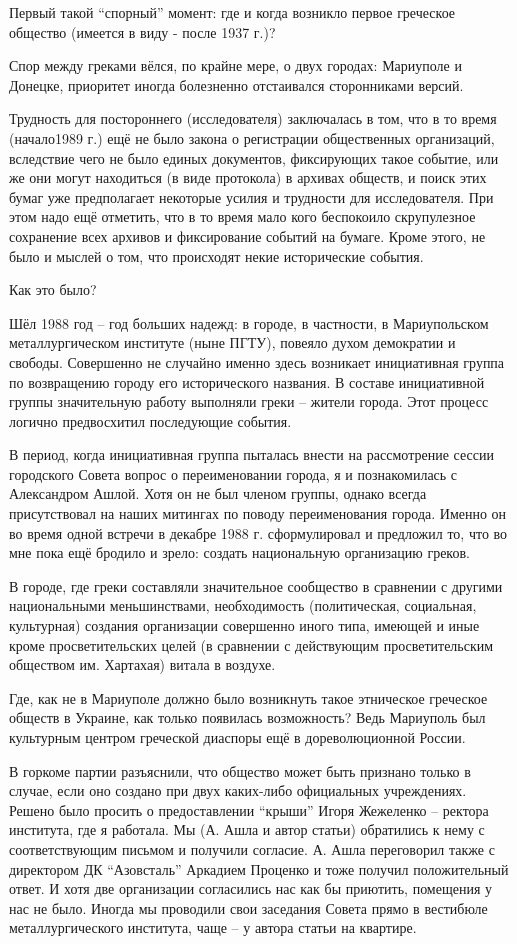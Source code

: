 Первый такой \enquote{спорный} момент: где и когда возникло первое греческое
общество (имеется в виду - после 1937 г.)?

Спор между греками вёлся, по крайне мере, о двух городах: Мариуполе и Донецке,
приоритет иногда болезненно отстаивался сторонниками версий.

Трудность для постороннего (исследователя)  заключалась  в  том, что в то время
(начало1989 г.) ещё не было закона о регистрации общественных организаций,
вследствие чего не было единых документов, фиксирующих такое событие, или же
они могут находиться (в виде протокола) в архивах обществ, и поиск этих бумаг
уже предполагает некоторые усилия и трудности для исследователя. При этом надо
ещё отметить, что в то время мало кого беспокоило скрупулезное сохранение всех
архивов и фиксирование событий на бумаге. Кроме этого, не было и мыслей о том,
что происходят некие исторические события.

Как это было?

Шёл 1988 год – год больших надежд: в городе, в частности, в Мариупольском
металлургическом институте (ныне ПГТУ), повеяло духом демократии и свободы.
Совершенно не случайно именно здесь возникает инициативная группа по
возвращению городу его исторического названия. В составе инициативной группы
значительную работу выполняли греки – жители города. Этот процесс логично
предвосхитил последующие события.

В период, когда инициативная группа пыталась внести на рассмотрение сессии
городского Совета вопрос о переименовании города, я и познакомилась с
Александром Ашлой. Хотя он не был членом группы, однако всегда присутствовал на
наших митингах по поводу переименования города. Именно он во время одной
встречи в декабре 1988 г. сформулировал и  предложил то, что во мне пока ещё
бродило и зрело: создать национальную организацию греков. 

В городе, где греки составляли значительное сообщество в сравнении с другими
национальными меньшинствами, необходимость (политическая, социальная,
культурная) создания организации совершенно иного типа, имеющей и иные кроме
просветительских целей (в сравнении с действующим просветительским обществом
им. Хартахая) витала в воздухе. 

Где, как не в Мариуполе должно было возникнуть такое этническое греческое
обществ в Украине, как только появилась возможность? Ведь Мариуполь был
культурным центром греческой диаспоры ещё в дореволюционной России.

В горкоме партии разъяснили, что общество может быть признано только в случае,
если оно создано при двух каких-либо официальных учреждениях.  Решено было
просить о предоставлении \enquote{крыши} Игоря Жежеленко – ректора института, где я
работала. Мы (А. Ашла и автор статьи) обратились к нему с соответствующим
письмом и получили согласие.  А. Ашла переговорил также с директором ДК
\enquote{Азовсталь} Аркадием Проценко и тоже получил положительный ответ. И хотя две
организации согласились нас как бы приютить, помещения у нас не было. Иногда мы
проводили свои заседания Совета прямо в вестибюле металлургического института,
чаще – у автора статьи на квартире.

